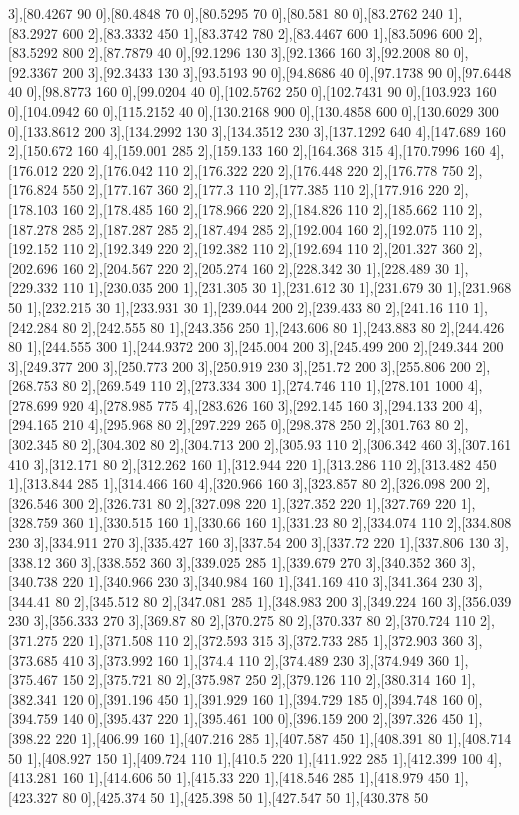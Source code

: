 {3],[80.4267 90 0],[80.4848 70 0],[80.5295 70 0],[80.581 80 0],[83.2762 240 1],[83.2927 600 2],[83.3332 450 1],[83.3742 780 2],[83.4467 600 1],[83.5096 600 2],[83.5292 800 2],[87.7879 40 0],[92.1296 130 3],[92.1366 160 3],[92.2008 80 0],[92.3367 200 3],[92.3433 130 3],[93.5193 90 0],[94.8686 40 0],[97.1738 90 0],[97.6448 40 0],[98.8773 160 0],[99.0204 40 0],[102.5762 250 0],[102.7431 90 0],[103.923 160 0],[104.0942 60 0],[115.2152 40 0],[130.2168 900 0],[130.4858 600 0],[130.6029 300 0],[133.8612 200 3],[134.2992 130 3],[134.3512 230 3],[137.1292 640 4],[147.689 160 2],[150.672 160 4],[159.001 285 2],[159.133 160 2],[164.368 315 4],[170.7996 160 4],[176.012 220 2],[176.042 110 2],[176.322 220 2],[176.448 220 2],[176.778 750 2],[176.824 550 2],[177.167 360 2],[177.3 110 2],[177.385 110 2],[177.916 220 2],[178.103 160 2],[178.485 160 2],[178.966 220 2],[184.826 110 2],[185.662 110 2],[187.278 285 2],[187.287 285 2],[187.494 285 2],[192.004 160 2],[192.075 110 2],[192.152 110 2],[192.349 220 2],[192.382 110 2],[192.694 110 2],[201.327 360 2],[202.696 160 2],[204.567 220 2],[205.274 160 2],[228.342 30 1],[228.489 30 1],[229.332 110 1],[230.035 200 1],[231.305 30 1],[231.612 30 1],[231.679 30 1],[231.968 50 1],[232.215 30 1],[233.931 30 1],[239.044 200 2],[239.433 80 2],[241.16 110 1],[242.284 80 2],[242.555 80 1],[243.356 250 1],[243.606 80 1],[243.883 80 2],[244.426 80 1],[244.555 300 1],[244.9372 200 3],[245.004 200 3],[245.499 200 2],[249.344 200 3],[249.377 200 3],[250.773 200 3],[250.919 230 3],[251.72 200 3],[255.806 200 2],[268.753 80 2],[269.549 110 2],[273.334 300 1],[274.746 110 1],[278.101 1000 4],[278.699 920 4],[278.985 775 4],[283.626 160 3],[292.145 160 3],[294.133 200 4],[294.165 210 4],[295.968 80 2],[297.229 265 0],[298.378 250 2],[301.763 80 2],[302.345 80 2],[304.302 80 2],[304.713 200 2],[305.93 110 2],[306.342 460 3],[307.161 410 3],[312.171 80 2],[312.262 160 1],[312.944 220 1],[313.286 110 2],[313.482 450 1],[313.844 285 1],[314.466 160 4],[320.966 160 3],[323.857 80 2],[326.098 200 2],[326.546 300 2],[326.731 80 2],[327.098 220 1],[327.352 220 1],[327.769 220 1],[328.759 360 1],[330.515 160 1],[330.66 160 1],[331.23 80 2],[334.074 110 2],[334.808 230 3],[334.911 270 3],[335.427 160 3],[337.54 200 3],[337.72 220 1],[337.806 130 3],[338.12 360 3],[338.552 360 3],[339.025 285 1],[339.679 270 3],[340.352 360 3],[340.738 220 1],[340.966 230 3],[340.984 160 1],[341.169 410 3],[341.364 230 3],[344.41 80 2],[345.512 80 2],[347.081 285 1],[348.983 200 3],[349.224 160 3],[356.039 230 3],[356.333 270 3],[369.87 80 2],[370.275 80 2],[370.337 80 2],[370.724 110 2],[371.275 220 1],[371.508 110 2],[372.593 315 3],[372.733 285 1],[372.903 360 3],[373.685 410 3],[373.992 160 1],[374.4 110 2],[374.489 230 3],[374.949 360 1],[375.467 150 2],[375.721 80 2],[375.987 250 2],[379.126 110 2],[380.314 160 1],[382.341 120 0],[391.196 450 1],[391.929 160 1],[394.729 185 0],[394.748 160 0],[394.759 140 0],[395.437 220 1],[395.461 100 0],[396.159 200 2],[397.326 450 1],[398.22 220 1],[406.99 160 1],[407.216 285 1],[407.587 450 1],[408.391 80 1],[408.714 50 1],[408.927 150 1],[409.724 110 1],[410.5 220 1],[411.922 285 1],[412.399 100 4],[413.281 160 1],[414.606 50 1],[415.33 220 1],[418.546 285 1],[418.979 450 1],[423.327 80 0],[425.374 50 1],[425.398 50 1],[427.547 50 1],[430.378 50 }
